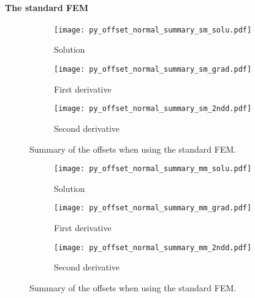 \documentclass[review,3p]{elsarticle}
\begin{document}

\paragraph{The standard FEM}		\label{scaling_std_FEM}

\begin{figure}[!ht]
    \begin{subfigure}{5.4cm}
        \texttt{[image: py\_offset\_normal\_summary\_sm\_solu.pdf]}
        \caption{Solution}
        \label{Fig:py_offset_normal_summary_sm_solu}
    \end{subfigure}
    \hspace{-0.2cm}
    \begin{subfigure}{5.4cm}
        \texttt{[image: py\_offset\_normal\_summary\_sm\_grad.pdf]}
        \caption{First derivative}
        \label{Fig:py_offset_normal_summary_sm_grad}
    \end{subfigure}
    \hspace{-0.2cm}
    \begin{subfigure}{5.4cm}
        \texttt{[image: py\_offset\_normal\_summary\_sm\_2ndd.pdf]}
        \caption{Second derivative}
        \label{Fig:py_offset_normal_summary_sm_2ndd}
    \end{subfigure}
\caption{Summary of the offsets when using the standard FEM.}
\label{Fig:py_offset_normal_summary_sm}
\end{figure}

\begin{figure}[!ht]
    \begin{subfigure}{5.4cm}
        \texttt{[image: py\_offset\_normal\_summary\_mm\_solu.pdf]}
        \caption{Solution}
        \label{Fig:py_offset_normal_summary_mm_solu}
    \end{subfigure}
    \hspace{-0.2cm}
    \begin{subfigure}{5.4cm}
        \texttt{[image: py\_offset\_normal\_summary\_mm\_grad.pdf]}
        \caption{First derivative}
        \label{Fig:py_offset_normal_summary_mm_grad}
    \end{subfigure}
    \hspace{-0.2cm}
    \begin{subfigure}{5.4cm}
        \texttt{[image: py\_offset\_normal\_summary\_mm\_2ndd.pdf]}
        \caption{Second derivative}
        \label{Fig:py_offset_normal_summary_mm_2ndd}
    \end{subfigure}
\caption{Summary of the offsets when using the standard FEM.}
\label{Fig:py_offset_normal_summary_mm}
\end{figure}
\end{document}
